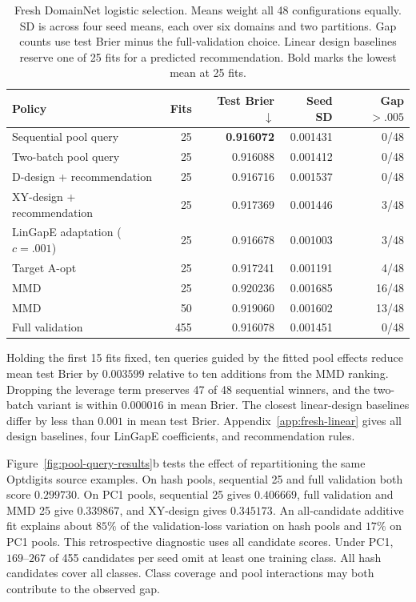 \begin{table}[t]
\centering
\caption{Fresh DomainNet logistic selection. Means weight all 48 configurations equally. SD is across four seed means, each over six domains and two partitions. Gap counts use test Brier minus the full-validation choice. Linear design baselines reserve one of 25 fits for a predicted recommendation. Bold marks the lowest mean at 25 fits.}
\label{tab:fresh-pool-query}
\begin{tabular}{lrrrr}
\toprule
Policy & Fits & Test Brier $\downarrow$ & Seed SD & Gap $>.005$ \\
\midrule
Sequential pool query        & 25  & \textbf{0.916072} & 0.001431 & 0/48 \\
Two-batch pool query         & 25  & 0.916088 & 0.001412 & 0/48 \\
D-design + recommendation    & 25  & 0.916716 & 0.001537 & 0/48 \\
XY-design + recommendation   & 25  & 0.917369 & 0.001446 & 3/48 \\
LinGapE adaptation ($c=.001$) & 25  & 0.916678 & 0.001003 & 3/48 \\
Target A-opt                 & 25  & 0.917241 & 0.001191 & 4/48 \\
MMD                          & 25  & 0.920236 & 0.001685 & 16/48 \\
MMD                          & 50  & 0.919060 & 0.001602 & 13/48 \\
Full validation              & 455 & 0.916078 & 0.001451 & 0/48 \\
\bottomrule
\end{tabular}
\end{table}

Holding the first 15 fits fixed, ten queries guided by the fitted pool effects reduce mean test Brier by $0.003599$ relative to ten additions from the MMD ranking. Dropping the leverage term preserves 47 of 48 sequential winners, and the two-batch variant is within $0.000016$ in mean Brier. The closest linear-design baselines differ by less than $0.001$ in mean test Brier. Appendix~\ref{app:fresh-linear} gives all design baselines, four LinGapE coefficients, and recommendation rules.

Figure~\ref{fig:pool-query-results}b tests the effect of repartitioning the same Optdigits source examples. On hash pools, sequential 25 and full validation both score $0.299730$. On PC1 pools, sequential 25 gives $0.406669$, full validation and MMD 25 give $0.339867$, and XY-design gives $0.345173$. An all-candidate additive fit explains about $85\%$ of the validation-loss variation on hash pools and $17\%$ on PC1 pools. This retrospective diagnostic uses all candidate scores. Under PC1, $169$--$267$ of 455 candidates per seed omit at least one training class. All hash candidates cover all classes. Class coverage and pool interactions may both contribute to the observed gap.

